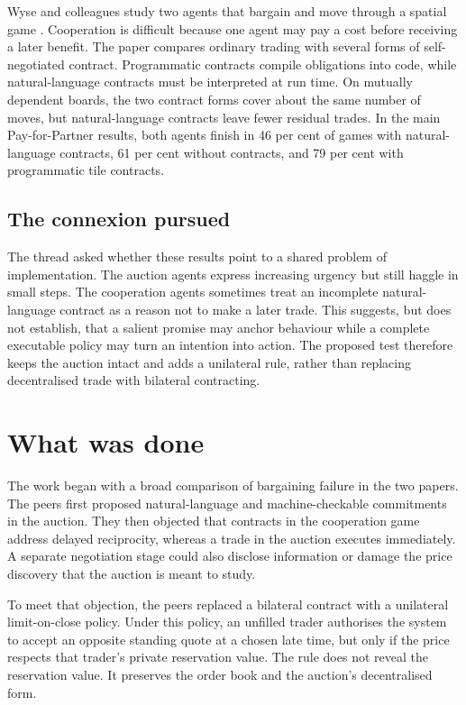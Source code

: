 \documentclass{article}
\begin{document}
Wyse and colleagues study two agents that bargain and move through a spatial game \cite{P}.  Cooperation is difficult because one agent may pay a cost before receiving a later benefit.  The paper compares ordinary trading with several forms of self-negotiated contract.  Programmatic contracts compile obligations into code, while natural-language contracts must be interpreted at run time.  On mutually dependent boards, the two contract forms cover about the same number of moves, but natural-language contracts leave fewer residual trades.  In the main Pay-for-Partner results, both agents finish in 46 per cent of games with natural-language contracts, 61 per cent without contracts, and 79 per cent with programmatic tile contracts.

\subsection{The connexion pursued}

The thread asked whether these results point to a shared problem of implementation.  The auction agents express increasing urgency but still haggle in small steps.  The cooperation agents sometimes treat an incomplete natural-language contract as a reason not to make a later trade.  This suggests, but does not establish, that a salient promise may anchor behaviour while a complete executable policy may turn an intention into action.  The proposed test therefore keeps the auction intact and adds a unilateral rule, rather than replacing decentralised trade with bilateral contracting.

\section{What was done}

The work began with a broad comparison of bargaining failure in the two papers.  The peers first proposed natural-language and machine-checkable commitments in the auction.  They then objected that contracts in the cooperation game address delayed reciprocity, whereas a trade in the auction executes immediately.  A separate negotiation stage could also disclose information or damage the price discovery that the auction is meant to study.

To meet that objection, the peers replaced a bilateral contract with a unilateral limit-on-close policy.  Under this policy, an unfilled trader authorises the system to accept an opposite standing quote at a chosen late time, but only if the price respects that trader's private reservation value.  The rule does not reveal the reservation value.  It preserves the order book and the auction's decentralised form.
\end{document}
